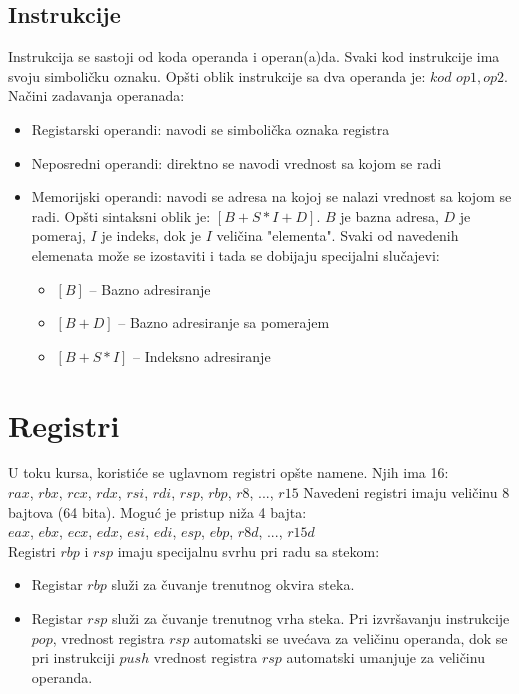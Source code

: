 \documentclass[a4paper, 10pt]{article}
\begin{document}
	\subsection{Instrukcije}
	Instrukcija se sastoji od koda operanda i operan(a)da. Svaki kod instrukcije ima svoju simboličku oznaku. Opšti oblik instrukcije sa dva operanda je: $kod$ $op1, op2$.
Načini zadavanja operanada:	
	\begin{itemize}
		\item Registarski operandi: navodi se simbolička oznaka registra
		\item Neposredni operandi: direktno se navodi vrednost sa kojom se radi
		\item Memorijski operandi: navodi se adresa na kojoj se nalazi vrednost sa kojom se radi. Opšti sintaksni oblik je: $[B + S*I + D]$. $B$ je bazna adresa, $D$ je pomeraj, $I$ je indeks, dok je $I$ veličina "elementa". Svaki od navedenih elemenata može se izostaviti i tada se dobijaju specijalni slučajevi:
		\begin{itemize}
			\item $[B]$ -- Bazno adresiranje
			\item $[B + D]$ -- Bazno adresiranje sa pomerajem
			\item $[B + S*I]$ -- Indeksno adresiranje
		\end{itemize}
	\end{itemize}
\section{Registri} 
U toku kursa, koristiće se uglavnom registri opšte namene. Njih ima 16: \\
	$rax$, $rbx$, $rcx$, $rdx$, $rsi$, $rdi$, $rsp$, $rbp$, $r8$, ..., $r15$ 
Navedeni registri imaju veličinu 8 bajtova (64 bita). Moguć je pristup niža 4 bajta: \\ 
	$eax$, $ebx$, $ecx$, $edx$, $esi$, $edi$, $esp$, $ebp$, $r8d$, ..., $r15d$ \\
Registri $rbp$ i $rsp$ imaju specijalnu svrhu pri radu sa stekom:
	\begin{itemize}
			\item Registar $rbp$ služi za čuvanje trenutnog okvira steka.
			\item Registar $rsp$ služi za čuvanje trenutnog vrha steka. Pri izvršavanju instrukcije $pop$, vrednost registra $rsp$ automatski se uvećava za veličinu operanda, dok se pri instrukciji $push$ vrednost registra $rsp$ automatski umanjuje za veličinu operanda.
	\end{itemize}
\end{document}

